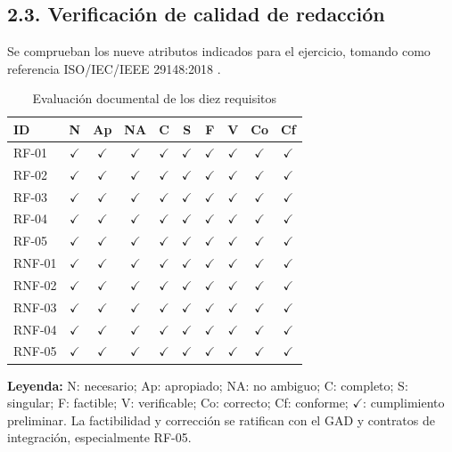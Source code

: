 \documentclass[conference,onecolumn]{IEEEtran}
\newcommand{\si}{\ensuremath{\checkmark}}
\begin{document}
\subsection*{2.3. Verificación de calidad de redacción}
Se comprueban los nueve atributos indicados para el ejercicio, tomando como referencia ISO/IEC/IEEE 29148:2018 \cite{iso29148}.
\begin{table}[H]
\centering
\caption{Evaluación documental de los diez requisitos}
\label{tab:evaluacion}
\scriptsize
\setlength{\tabcolsep}{2.4pt}
\begin{tabular}{@{}l*{9}{c}@{}}
\toprule
\textbf{ID} & \textbf{N} & \textbf{Ap} & \textbf{NA} & \textbf{C} & \textbf{S} & \textbf{F} & \textbf{V} & \textbf{Co} & \textbf{Cf}\\
\midrule
RF-01 & \si & \si & \si & \si & \si & \si & \si & \si & \si\\
RF-02 & \si & \si & \si & \si & \si & \si & \si & \si & \si\\
RF-03 & \si & \si & \si & \si & \si & \si & \si & \si & \si\\
RF-04 & \si & \si & \si & \si & \si & \si & \si & \si & \si\\
RF-05 & \si & \si & \si & \si & \si & \si & \si & \si & \si\\
RNF-01 & \si & \si & \si & \si & \si & \si & \si & \si & \si\\
RNF-02 & \si & \si & \si & \si & \si & \si & \si & \si & \si\\
RNF-03 & \si & \si & \si & \si & \si & \si & \si & \si & \si\\
RNF-04 & \si & \si & \si & \si & \si & \si & \si & \si & \si\\
RNF-05 & \si & \si & \si & \si & \si & \si & \si & \si & \si\\
\bottomrule
\end{tabular}
\end{table}
\noindent\footnotesize\textbf{Leyenda:} N: necesario; Ap: apropiado; NA: no ambiguo; C: completo; S: singular; F: factible; V: verificable; Co: correcto; Cf: conforme; \si: cumplimiento preliminar. La factibilidad y corrección se ratifican con el GAD y contratos de integración, especialmente RF-05.\normalsize
\end{document}
